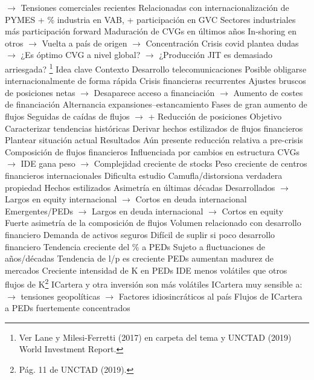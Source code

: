\documentclass{nuevotema}
\begin{document}
\begin{esquemal}
				\4[] $\to$ Tensiones comerciales recientes
				\4[vi] Relacionadas con internacionalización de PYMES
				\4[vii] + \% industria en VAB, + participación en GVC
				\4[] Sectores industriales más participación forward
				\4[viii] Maduración de CVGs en últimos años
				\4[] In-shoring en otros
				\4[] $\to$ Vuelta a país de origen
				\4[] $\to$ Concentración
				\4[] Crisis covid plantea dudas
				\4[] $\to$ ¿Es óptimo CVG a nivel global?
				\4[] $\to$ ¿Producción JIT es demasiado arriesgada?
	\1 \footnote{Ver Lane y Milesi-Ferretti (2017) en carpeta del tema y UNCTAD (2019) World Investment Report.}
		\2 Idea clave
			\3 Contexto
				\4 Desarrollo telecomunicaciones
				\4[] Posible obligarse internacionalmente de forma rápida
				\4 Crisis financieras recurrentes
				\4[] Ajustes bruscos de posiciones netas
				\4[] $\to$ Desaparece acceso a financiación
				\4[] $\to$ Aumento de costes de financiación
				\4 Alternancia expansiones--estancamiento
				\4[] Fases de gran aumento de flujos
				\4[] Seguidas de caídas de flujos
				\4[] $\to$ + Reducción de posiciones
			\3 Objetivo
				\4 Caracterizar tendencias históricas
				\4 Derivar hechos estilizados de flujos financieros
				\4 Plantear situación actual
			\3 Resultados
				\4 Aún presente reducción relativa a pre-crisis
				\4 Composición de flujos financieros
				\4[] Influenciada por cambios en estructura CVGs
				\4[] $\to$ IDE gana peso
				\4[] $\to$ Complejidad creciente de stocks
				\4 Peso creciente de centros financieros internacionales
				\4[] Dificulta estudio
				\4[] Camufla/distorsiona verdadera propiedad
		\2 Hechos estilizados
			\3[i] Asimetría en últimas décadas
				\4 Desarrollados
				\4[] $\to$ Largos en equity internacional
				\4[] $\to$ Cortos en deuda internacional
				\4 Emergentes/PEDs
				\4[] $\to$ Largos en deuda internacional
				\4[] $\to$ Cortos en equity
				\4[$\then$] Fuerte asimetría de la composición de flujos
			\3[ii] Volumen relacionado con desarrollo financiero
				\4 Demanda de activos seguros
				\4[] Difícil de suplir si poco desarrollo financiero
			\3[iii] Tendencia creciente del \% a PEDs
				\4 Sujeto a fluctuaciones de años/décadas
				\4 Tendencia de l/p es creciente
				\4 PEDs aumentan madurez de mercados
				\4 Creciente intensidad de K en PEDs
			\3[iv] IDE menos volátiles que otros flujos de K\footnote{Pág. 11 de UNCTAD (2019). }
				\4 ICartera y otra inversión son más volátiles
				\4 ICartera muy sensible a:
				\4[] $\to$  tensiones geopolíticas
				\4[] $\to$ Factores idiosincráticos al país
			\3[v] Flujos de ICartera a PEDs fuertemente concentrados

\end{esquemal}
\end{document}
